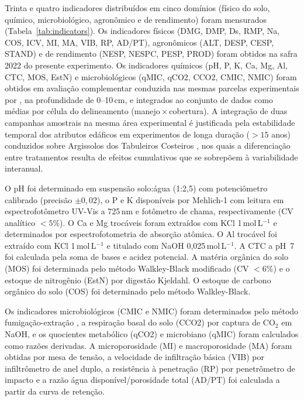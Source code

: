 \documentclass[pdflatex,sn-basic]{sn-jnl}%
\begin{document}
Trinta e quatro indicadores distribuídos em cinco domínios (físico do solo, químico, microbiológico, agronômico e de rendimento) foram mensurados (Tabela~\ref{tab:indicators}). Os indicadores físicos (DMG, DMP, Ds, RMP, Na, COS, ICV, MI, MA, VIB, RP, AD/PT), agronômicos (ALT, DESP, CESP, STAND) e de rendimento (NESP, NESPC, PESP, PROD) foram obtidos na safra 2022 do presente experimento. Os indicadores químicos (pH, P, K, Ca, Mg, Al, CTC, MOS, EstN) e microbiológicos (qMIC, qCO2, CCO2, CMIC, NMIC) foram obtidos em avaliação complementar conduzida nas mesmas parcelas experimentais por \cite{Sara2019}, na profundidade de 0--10\,cm, e integrados ao conjunto de dados como médias por célula do delineamento (manejo\,$\times$\,cobertura). A integração de duas campanhas amostrais na mesma área experimental é justificada pela estabilidade temporal dos atributos edáficos em experimentos de longa duração ($> 15$ anos) conduzidos sobre Argissolos dos Tabuleiros Costeiros \citep{Assuncao2023}, nos quais a diferenciação entre tratamentos resulta de efeitos cumulativos que se sobrepõem à variabilidade interanual.

O pH foi determinado em suspensão solo:água (1:2,5) com potenciômetro calibrado (precisão $\pm 0{,}02$), o P e K disponíveis por Mehlich-1 com leitura em espectrofotômetro UV-Vis a 725\,nm e fotômetro de chama, respectivamente (CV analítico $< 5$\%). O Ca e Mg trocáveis foram extraídos com KCl 1\,mol\,L$^{-1}$ e determinados por espectrofotometria de absorção atômica. O Al trocável foi extraído com KCl 1\,mol\,L$^{-1}$ e titulado com NaOH 0,025\,mol\,L$^{-1}$. A CTC a pH~7 foi calculada pela soma de bases e acidez potencial. A matéria orgânica do solo (MOS) foi determinada pelo método Walkley-Black modificado (CV $< 6$\%) e o estoque de nitrogênio (EstN) por digestão Kjeldahl. O estoque de carbono orgânico do solo (COS) foi determinado pelo método Walkley-Black.

Os indicadores microbiológicos (CMIC e NMIC) foram determinados pelo método fumigação-extração \citep{Vance1987}, a respiração basal do solo (CCO2) por captura de CO$_2$ em NaOH, e os quocientes metabólico (qCO2) e microbiano (qMIC) foram calculados como razões derivadas. A microporosidade (MI) e macroporosidade (MA) foram obtidas por mesa de tensão, a velocidade de infiltração básica (VIB) por infiltrômetro de anel duplo, a resistência à penetração (RP) por penetrômetro de impacto e a razão água disponível/porosidade total (AD/PT) foi calculada a partir da curva de retenção.
\end{document}
